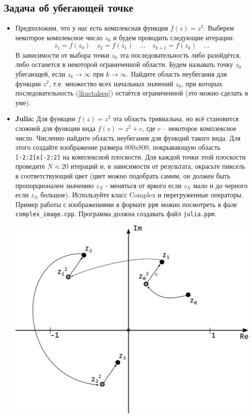 \documentclass{article}
\begin{document}
\subsection*{Задача об убегающей точке}
\begin{itemize}
\item Предположим, что у нас есть комплексная функция $f(z) = z^2$. Выберем некоторое комплексное число $z_0$ и будем проводить следующие итерации: 
\begin{equation}
\label{fractalseq}
z_1 = f(z_0)\quad z_2 = f(z_1)\quad ...\quad z_{k+1} = f(z_k)\quad ...
\end{equation}
В зависимости от выбора точки $z_0$ эта последовательность либо разойдётся, либо останется в некоторой ограниченной области. Будем называть точку $z_0$ убегающей, если $z_k \rightarrow \infty$ при $k \rightarrow \infty$. Найдите область неубегания для функции $z^2$, т.е. множество всех начальных значений $z_0$, при которых последовательность (\ref{fractalseq}) остаётся ограниченной (это можно сделать в уме). \\

\item \textbf{Julia:} Для функции $f(z) = z^2$ эта область тривиальна, но всё становится сложней для функции вида $f(z) = z^2 + c$, где $c$ -- некоторое комплексное число. Численно найдите область неубегания для функций такого вида. Для этого создайте изображение размера 800x800, покрывающую область \texttt{[-2:2]x[-2:2]} на комплексной плоскости. Для каждой точки этой плоскости проведите $N \approx 20$ итераций и, в зависимости от результата, окрасьте пиксель в соответствующий цвет (цвет можно подобрать самим, он должен быть пропорционален значению $z_N$ - меняться от яркого если $z_N$ мало и до черного если $z_N$ большое). Используйте класс Complex и перегруженные операторы. Пример работы с изображениями в формате \texttt{ppm} можно посмотреть в фале \texttt{complex\_image.cpp}. Программа должна создавать файл \texttt{julia.ppm}.

\begin{center}
\includegraphics[scale=0.7]{../images/complexplane.png}
\end{center}


\end{itemize}
\end{document}
